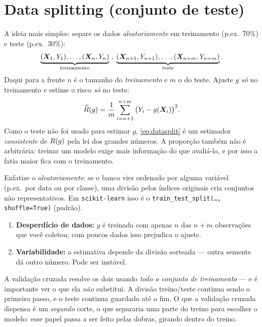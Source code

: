 \documentclass[11pt,a4paper]{article}
\begin{document}
\section{Data splitting (conjunto de teste)}
A ideia mais simples: separe os dados \emph{aleatoriamente} em treinamento
(p.ex.\ 70\%) e teste (p.ex.\ 30\%):
\[
  \underbrace{(\bm{X}_1,Y_1),\dots,(\bm{X}_n,Y_n)}_{\text{treinamento}}\;,\;
  \underbrace{(\bm{X}_{n+1},Y_{n+1}),\dots,(\bm{X}_{n+m},Y_{n+m})}_{\text{teste}}.
\]
Daqui para a frente $n$ é o tamanho do \emph{treinamento} e $m$ o do teste.
Ajuste $g$ \emph{só} no treinamento e estime o risco \emph{só} no teste:
\begin{equation}\label{eq:datasplit}
  \widehat{R}(g) = \frac{1}{m}\sum_{i=n+1}^{n+m} \big(Y_i - g(\bm{X}_i)\big)^2 .
\end{equation}
Como o teste não foi usado para estimar $g$, \eqref{eq:datasplit} é um
estimador \emph{consistente} de $R(g)$ pela lei dos grandes números. A
proporção também não é arbitrária: treinar um modelo exige mais informação do que
avaliá-lo, e por isso a fatia maior fica com o treinamento.

\begin{emsala}
Enfatize o \emph{aleatoriamente}: se o banco vier ordenado por alguma variável
(p.ex.\ por data ou por classe), uma divisão pelos índices originais cria
conjuntos não representativos. Em \texttt{scikit-learn} isso é o
\texttt{train\_test\_split(\dots, shuffle=True)} (padrão).
\end{emsala}

\begin{atencao}
\begin{enumerate}[leftmargin=1.5cm,nosep]
  \item \textbf{Desperdício de dados:} $g$ é treinada com apenas $n$ das $n+m$
        observações que você coletou; com poucos dados isso prejudica o ajuste.
  \item \textbf{Variabilidade:} a estimativa depende da divisão sorteada --- outra
        semente dá outro número. Pode ser instável.
\end{enumerate}
A validação cruzada resolve os dois usando \emph{todo o conjunto de treinamento}
--- e é importante ver o que ela \emph{não} substitui. A divisão treino/teste
continua sendo o primeiro passo, e o teste continua guardado até o fim. O que a
validação cruzada dispensa é um \emph{segundo} corte, o que separaria uma parte do
treino para escolher o modelo: esse papel passa a ser feito pelas dobras, girando
dentro do treino.
\end{atencao}
\end{document}
